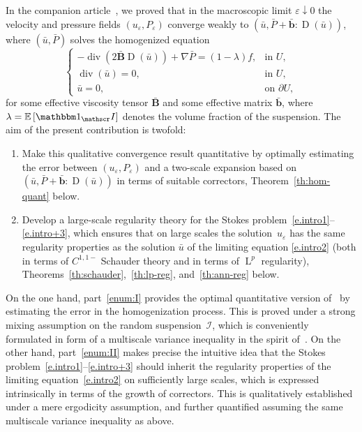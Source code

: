 \documentclass[10pt]{amsart}
\let\mathcal\mathscr
\newcounter{assumption}
\let\mathds\mathbbm
\theoremstyle{plain}
\theoremstyle{definition}
\newcommand{\e}{\varepsilon}
\newcommand{\Ic}{\mathcal I}
\newcommand{\D}{\operatorname{D}}
\newcommand{\bb}{\bar{\boldsymbol b}}
\newcommand{\Bb}{\bar{\boldsymbol B}}
\newcommand{\Ld}{\operatorname{L}}
\newcommand{\Div}{{\operatorname{div}}}
\newcommand{\expec}[1]{\mathbb{E}\left[ #1 \right]}
\begin{document}
In the companion article~\cite{DG-19}, we proved that in the macroscopic limit $\e \downarrow 0$ the velocity and pressure fields $(u_\e,P_\e)$ converge weakly to $(\bar u, \bar P+\bb:\D(\bar u))$, where $(\bar u,\bar P)$ solves the homogenized equation
\begin{equation}\label{e.intro2}
\begin{cases}
-\Div(2\Bb \D(\bar u))+\nabla\bar P=(1-\lambda) f ,&\text{in $U$},\\
\Div(\bar u)=0,&\text{in $U$},\\
\bar u=0,&\text{on $\partial U$},
\end{cases}
\end{equation}
for some effective viscosity tensor $\Bb$ and some effective matrix $\bb$, where $\lambda=\expec{\mathds1_\Ic}$ denotes the volume fraction of the suspension.
The aim of the present contribution is twofold:
\begin{enumerate}\renewcommand{\theenumi}{\Roman{enumi}}
\item\label{enum:I} Make this qualitative convergence result quantitative by optimally estimating the error between $(u_\e,P_\e)$ and a two-scale expansion based on $(\bar u, \bar P+\bb:\D(\bar u))$ in terms of suitable correctors, \cf Theorem~\ref{th:hom-quant} below.
\item\label{enum:II} Develop a large-scale regularity theory for the Stokes problem~\eqref{e.intro1}--\eqref{e.intro+3}, which ensures that on large scales the solution~$u_\e$ has the same
regularity properties as the solution $\bar u$ of the limiting equation \eqref{e.intro2} (both in terms of $C^{1,1-}$ Schauder theory and in terms of $\Ld^p$ regularity), \cf Theorems~\ref{th:schauder},~\ref{th:lp-reg}, and~\ref{th:ann-reg} below.
\end{enumerate}
On the one hand, part~\eqref{enum:I} provides the optimal quantitative version of~\cite{DG-19} by estimating the error in the homogenization process.
This is proved under a strong mixing assumption on the random suspension~$\Ic$, which is conveniently formulated in form of a multiscale variance inequality in the spirit of~\cite{DG1,DG2}.
On the other hand, part~\eqref{enum:II}
makes precise the intuitive idea that the Stokes problem~\eqref{e.intro1}--\eqref{e.intro+3} should inherit the regularity properties of the limiting equation~\eqref{e.intro2} on sufficiently large scales, which is expressed intrinsically in terms of the growth of correctors.
This is qualitatively established under a mere ergodicity assumption, and further quantified assuming the same multiscale variance inequality as above.
\end{document}
